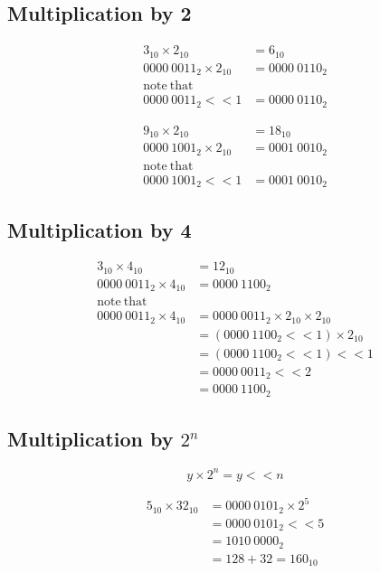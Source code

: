 \documentclass{article}
\begin{document}
\subsection{Multiplication by 2}

\begin{align*}
3_{10} \times 2_{10} &= 6_{10} \\
0000\ 0011_2 \times 2_{10} &= 0000\ 0110_2 \\
\mathrm{note\ that} & \\
0000\ 0011_2 << 1 &= 0000\ 0110_2
\end{align*}

\begin{align*}
9_{10} \times 2_{10} &= 18_{10} \\
0000\ 1001_2 \times 2_{10} &= 0001\ 0010_2 \\
\mathrm{note\ that} & \\
0000\ 1001_2 << 1 &= 0001\ 0010_2
\end{align*}

\subsection{Multiplication by 4}

\begin{align*}
3_{10} \times 4_{10} &= 12_{10} \\
0000\ 0011_2 \times 4_{10} &= 0000\ 1100_2 \\
\mathrm{note\ that} & \\
0000\ 0011_2 \times 4_{10} &= 0000\ 0011_2 \times 2_{10} \times 2_{10} \\
                           &= (0000\ 1100_2 << 1) \times 2_{10} \\
                           &= (0000\ 1100_2 << 1) << 1 \\
                           &= 0000\ 0011_2 << 2 \\
                           &= 0000\ 1100_2
\end{align*}

\subsection{Multiplication by $2^n$}

\[ y \times 2^n = y << n \]

\begin{align*}
5_{10} \times 32_{10} &= 0000\ 0101_2 \times 2^5 \\
                      &= 0000\ 0101_2 << 5 \\
                      &= 1010\ 0000_2 \\
                      &= 128 + 32 = 160_{10}
\end{align*}
\end{document}
